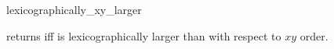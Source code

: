 \begin{ccRefFunction}{lexicographically_xy_larger}

{returns  iff  is lexicographically larger
than  with respect to $xy$ order.}
\end{ccRefFunction}

